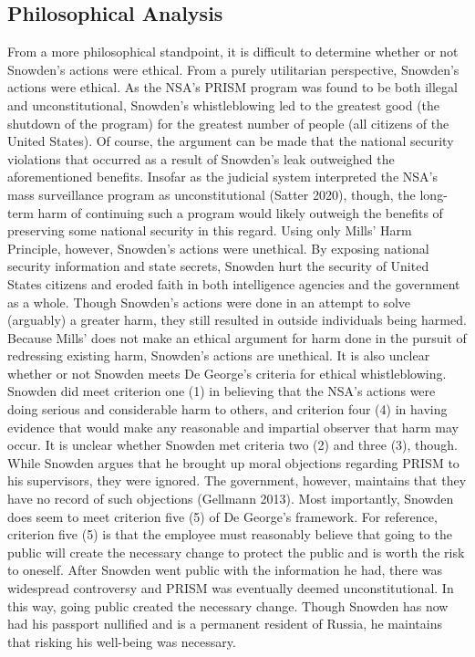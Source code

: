\documentclass [12 pt] {article}
\begin{document}
\subsection {Philosophical Analysis}
From a more philosophical standpoint, it is difficult to determine whether or not Snowden's actions were ethical. From a purely utilitarian perspective, Snowden's actions were ethical. As the NSA's PRISM program was found to be both illegal and unconstitutional, Snowden's whistleblowing led to the greatest good (the shutdown of the program) for the greatest number of people (all citizens of the United States). Of course, the argument can be made that the national security violations that occurred as a result of Snowden's leak outweighed the aforementioned benefits. Insofar as the judicial system interpreted the NSA's mass surveillance program as unconstitutional (Satter 2020), though, the long-term harm of continuing such a program would likely outweigh the benefits of preserving some national security in this regard.
\bigbreak
Using only Mills' Harm Principle, however, Snowden's actions were unethical. By exposing national security information and state secrets, Snowden hurt the security of United States citizens and eroded faith in both intelligence agencies and the government as a whole. Though Snowden's actions were done in an attempt to solve (arguably) a greater harm, they still resulted in outside individuals being harmed. Because Mills' does not make an ethical argument for harm done in the pursuit of redressing existing harm, Snowden's actions are unethical.
\bigbreak
It is also unclear whether or not Snowden meets De George's criteria for ethical whistleblowing. Snowden did meet criterion one (1) in believing that the NSA's actions were doing serious and considerable harm to others, and criterion four (4) in having evidence that would make any reasonable and impartial observer that harm may occur.  It is unclear whether Snowden met criteria two (2) and three (3), though. While Snowden argues that he brought up moral objections regarding PRISM to his supervisors, they were ignored. The government, however, maintains that they have no record of such objections (Gellmann 2013). Most importantly, Snowden does seem to meet criterion five (5) of De George's framework. For reference, criterion five (5) is that the employee must reasonably believe that going to the public will create the necessary change to protect the public and is worth the risk to oneself. After Snowden went public with the information he had, there was widespread controversy and PRISM was eventually deemed unconstitutional. In this way, going public created the necessary change. Though Snowden has now had his passport nullified and is a permanent resident of Russia, he maintains that risking his well-being was necessary.
\end{document}
